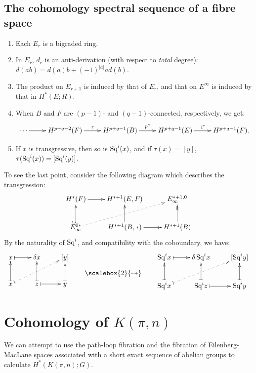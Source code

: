 \documentclass[11pt]{article}
\newcommand{\Squ}{\textup{Sq}}
\theoremstyle{plain}
\theoremstyle{definition}
\newcommand{\bigrightsquig}{\scalebox{2}{\ensuremath{\rightsquigarrow}}}
\newcommand{\squishlist}{
  \setlength{\itemsep}{1pt}
  \setlength{\parskip}{0pt}
  \setlength{\parsep}{0pt}
}
\begin{document}
\subsection{The cohomology spectral sequence of a fibre space}
\begin{enumerate}
\squishlist
\item Each $E_r$ is a bigraded ring.
\item In $E_r$, $d_r$ is an anti-derivation (with respect to \emph{total} degree): $d(ab)=d(a)b+(-1)^{|a|}ad(b)$.
\item The product on $E_{r+1}$ is induced by that of $E_r$, and that on $E^\infty$ is induced by that in $H^*(E;R)$.
\item When $B$ and $F$ are $(p-1)$- and $(q-1)$-connected, respectively, we get:
\[\xymatrix{
\cdots\ar[r]&H^{p+q-2}(F)\ar[r]^\tau&H^{p+q-1}(B)\ar[r]^{p^*}&H^{p+q-1}(E)\ar[r]^{i^*}&H^{p+q-1}(F).
}\]
\item If $x$ is transgressive, then so is $\Squ^i(x)$, and if $\tau(x)=[y]$, $\tau(\Squ^i(x))=[\Squ^i(y)]$.
\end{enumerate}
To see the last point, consider the following diagram which describes the transgression:
\[\xymatrix{
H^*(F)\ar[r]&H^{*+1}(E,F)&E_\infty^{*+1,0}\\
E_\infty^{0*}\ar@{^{(}->}[u]\ar@{.>}[rur]&H^{*+1}(B,*)\ar[u]\ar[r]&H^{*+1}(B)\ar@{->>}[u]
}\]
By the naturality of $\Squ^i$, and compatibility with the coboundary, we have:
\[\xymatrix{
x\ar@{|->}[r]&\delta x&[y]\\
x\ar@{|.>}[rur]\ar@{|->}[u]&z\ar@{|->}[u]\ar@{|->}[r]&y\ar@{|->}[u]
}\raisebox{-.8cm}{\qquad\bigrightsquig\qquad }
\xymatrix{
\Squ^ix\ar@{|->}[r]&\delta\,\Squ^ix&[\Squ^iy]\\
\Squ^ix\ar@{|.>}[rur]\ar@{|->}[u]&\Squ^iz\ar@{|->}[u]\ar@{|->}[r]&\Squ^iy\ar@{|->}[u]
}\]

\section{Cohomology of $K(\pi,n)$}
We can attempt to use the path-loop fibration and the fibration of Eilenberg-MacLane spaces associated with a short exact sequence of abelian groups to calculate $H^*(K(\pi,n);G)$.
\end{document}
